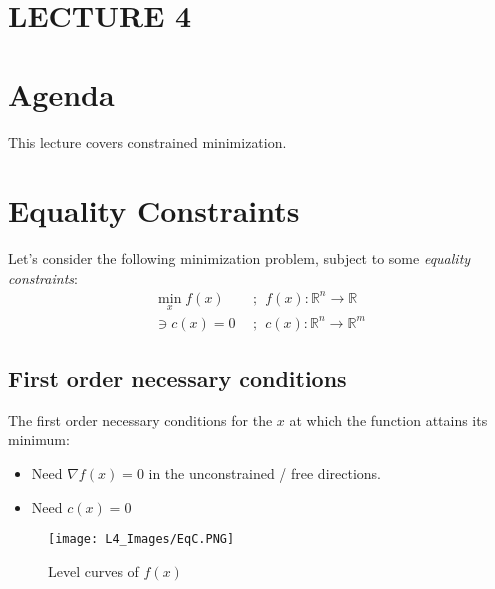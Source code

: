 \newpage
\section{LECTURE 4}

\section{Agenda}
This lecture covers constrained minimization.

\section{Equality Constraints}
Let's consider the following minimization problem, subject to some \textit{equality constraints}: 
\begin{align}
    \min_x f(x) \ \ &; \ \ f(x) : \mathbb{R}^n \longrightarrow \mathbb{R} \\
    \ni c(x) = 0 \ \ &; \ \ c(x) :  \mathbb{R}^n \longrightarrow \mathbb{R}^m
\end{align}

\subsection{First order necessary conditions}
The first order necessary conditions for the $x$ at which the function attains its minimum:
\begin{itemize}
    \item Need $\nabla f(x) = 0$ in the unconstrained / free directions. 
    \item Need $c(x)=0$
\end{itemize}

\begin{figure}
    \centering
    \texttt{[image: L4\_Images/EqC.PNG]}
    \caption{Level curves of $f(x)$}
    \label{fig:l4f1}
\end{figure}

